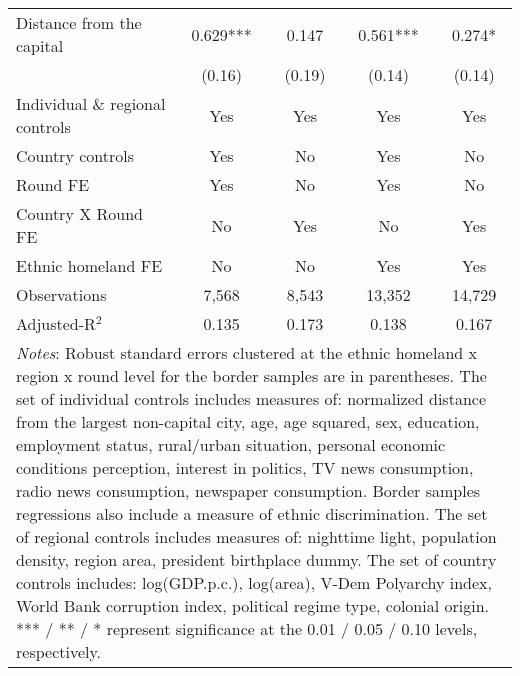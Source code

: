 \documentclass[11pt]{article}
\theoremstyle{plain}
\theoremstyle{plain}
\begin{document}
\begin{table}[H]
{\begin{tabular}{@{\extracolsep{5pt}} l c c c c}
          Distance from the capital&       0.629***&       0.147   &       0.561***&       0.274*  \\
           \medskip
           &      (0.16)   &      (0.19)   &      (0.14)   &      (0.14)   \\
          \midrule
           \smallskip
          Individual \& regional controls  & Yes & Yes & Yes & Yes  \\
          \smallskip
          Country controls & Yes& No& Yes& No\\
          \smallskip
          Round FE & Yes & No& Yes & No\\
          \smallskip
          Country X Round FE       & No & Yes& No & Yes\\
          \smallskip
          Ethnic homeland FE & No & No & Yes& Yes\\
          \smallskip
          Observations           &       7,568   &        8,543   &       13,352   &       14,729    \\
          Adjusted-R$^2$         &        0.135   &       0.173   &       0.138   &       0.167   \\
                                \bottomrule
          \multicolumn{5}{p{12.5cm}}{\footnotesize \emph{Notes}: Robust standard errors clustered at the ethnic homeland x region x round level for the border samples are in parentheses. The set of individual controls
          includes measures of: normalized distance from the largest non-capital city, age, age squared, sex,
          education, employment status, rural/urban situation, personal economic conditions perception, interest in politics, TV news consumption, radio news consumption, newspaper consumption. Border samples regressions also include a measure of ethnic discrimination. The set of regional controls includes measures of: nighttime light, population density, region area, president birthplace dummy. The set of country controls includes: log(GDP.p.c.), log(area), V-Dem Polyarchy index, World Bank corruption index, political regime type, colonial origin. *** / ** / * represent significance at the 0.01 / 0.05 / 0.10 levels, respectively.}
          \end{tabular}
          }
          \end{table}
      
\end{document}

